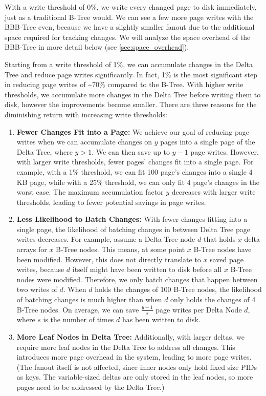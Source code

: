 With a write threshold of 0\%, we write every changed page to disk immediately, just as a traditional B-Tree would.
We can see a few more page writes with the BBB-Tree even, because we have a slightly smaller fanout due to the additional space required for tracking changes.
We will analyze the space overhead of the BBB-Tree in more detail below (see \autoref{sec:space_overhead}).

Starting from a write threshold of 1\%, we can accumulate changes in the Delta Tree and reduce page writes significantly.
In fact, 1\% is the most significant step in reducing page writes of \textasciitilde70\% compared to the B-Tree.
With higher write thresholds, we accumulate more changes in the Delta Tree before writing them to disk, however the improvements become smaller.
There are three reasons for the diminishing return with increasing write thresholds:
\begin{enumerate}
\item \textbf{Fewer Changes Fit into a Page:} 
We achieve our goal of reducing page writes when we can accumulate changes on $y$ pages into a single page of the Delta Tree, where $y > 1$.
We can then save up to $y - 1$ page writes.
However, with larger write thresholds, fewer pages' changes fit into a single page.
For example, with a 1\% threshold, we can fit 100 page's changes into a single 4 KB page, while with a 25\% threshold, we can only fit 4 page's changes in the worst case.
The maximum accumulation factor $y$ decreases with larger write thresholds, leading to fewer potential savings in page writes.
\item \textbf{Less Likelihood to Batch Changes:}
With fewer changes fitting into a single page, the likelihood of batching changes in between Delta Tree page writes decreases.
For example, assume a Delta Tree node $d$ that holds $x$ delta arrays for $x$ B-Tree nodes.
This means, at some point $x$ B-Tree nodes have been modified. 
However, this does not directly translate to $x$ saved page writes, because $d$ itself might have been written to disk before all $x$ B-Tree nodes were modified.
Therefore, we only batch changes that happen between two writes of $d$.
When $d$ holds the changes of 100 B-Tree nodes, the likelihood of batching changes is much higher than when $d$ only holds the changes of 4 B-Tree nodes.
On average, we can save $\frac{y - 1}{s}$ page writes per Delta Node $d$, where $s$ is the number of times $d$ has been written to disk.
\item \textbf{More Leaf Nodes in Delta Tree:}
Additionally, with larger deltas, we require more leaf nodes in the Delta Tree to address all changes.
This introduces more page overhead in the system, leading to more page writes.
(The fanout itself is not affected, since inner nodes only hold fixed size \ac{PID}s as keys. The variable-sized deltas are only stored in the leaf nodes, so more pages need to be addressed by the Delta Tree.)
\end{enumerate}

